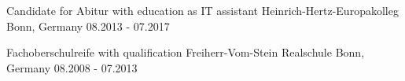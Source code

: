 

\begin{cventries}


  \cventry
    {Candidate for Abitur with education as IT assistant} %
    {Heinrich-Hertz-Europakolleg} %
    {Bonn, Germany} %
    {08.2013 - 07.2017} %
    { %
    }
  
  \cventry
    {Fachoberschulreife with qualification}
    {Freiherr-Vom-Stein Realschule}
    {Bonn, Germany}
    {08.2008 - 07.2013}
    {
    }

\end{cventries}
